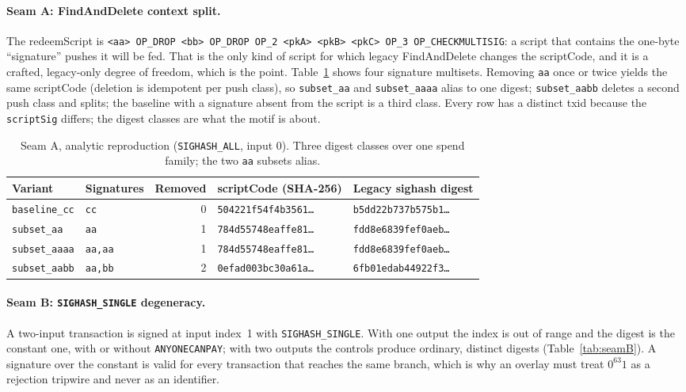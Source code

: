 \documentclass[11pt]{article}
\begin{document}
\paragraph{Seam A: FindAndDelete context split.} The redeemScript is
\texttt{<aa> OP\_DROP <bb> OP\_DROP OP\_2 <pkA> <pkB> <pkC> OP\_3 OP\_CHECKMULTISIG}:
a script that contains the one-byte ``signature'' pushes it will be fed. That
is the only kind of script for which legacy FindAndDelete changes the
scriptCode, and it is a crafted, legacy-only degree of freedom, which is the
point. Table~\ref{tab:seamA} shows four signature multisets. Removing
\texttt{aa} once or twice yields the same scriptCode (deletion is idempotent
per push class), so \texttt{subset\_aa} and \texttt{subset\_aaaa} alias to one
digest; \texttt{subset\_aabb} deletes a second push class and splits; the
baseline with a signature absent from the script is a third class. Every row has
a distinct txid because the \texttt{scriptSig} differs; the digest classes are
what the motif is about.

\begin{table}[t]
\centering
\small
\begin{tabular}{llrll}
\toprule
Variant & Signatures & Removed & scriptCode (SHA-256) & Legacy sighash digest \\
\midrule
\texttt{baseline\_cc} & \texttt{cc} & 0 & \texttt{504221f54f4b3561\ldots} & \texttt{b5dd22b737b575b1\ldots} \\
\texttt{subset\_aa} & \texttt{aa} & 1 & \texttt{784d55748eaffe81\ldots} & \texttt{fdd8e6839fef0aeb\ldots} \\
\texttt{subset\_aaaa} & \texttt{aa,aa} & 1 & \texttt{784d55748eaffe81\ldots} & \texttt{fdd8e6839fef0aeb\ldots} \\
\texttt{subset\_aabb} & \texttt{aa,bb} & 2 & \texttt{0efad003bc30a61a\ldots} & \texttt{6fb01edab44922f3\ldots} \\
\bottomrule
\end{tabular}
\caption{Seam A, analytic reproduction (\texttt{SIGHASH\_ALL}, input 0). Three
digest classes over one spend family; the two \texttt{aa} subsets alias.}
\label{tab:seamA}
\end{table}

\paragraph{Seam B: \texttt{SIGHASH\_SINGLE} degeneracy.} A two-input
transaction is signed at input index~1 with \texttt{SIGHASH\_SINGLE}. With one
output the index is out of range and the digest is the constant one, with or
without \texttt{ANYONECANPAY}; with two outputs the controls produce ordinary,
distinct digests (Table~\ref{tab:seamB}). A signature over the constant is
valid for every transaction that reaches the same branch, which is why an
overlay must treat $0^{63}1$ as a rejection tripwire and never as an identifier.
\end{document}

